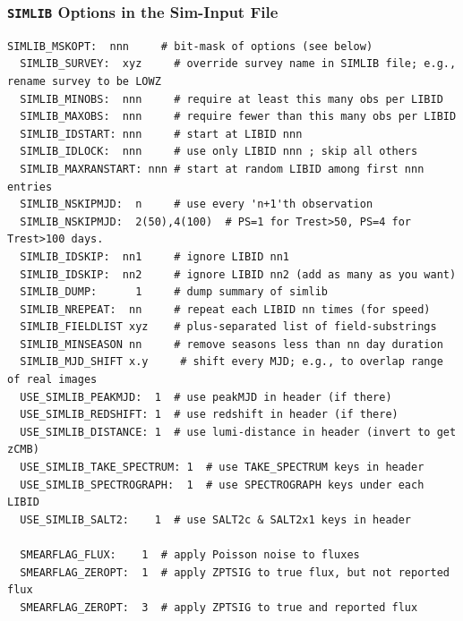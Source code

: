 \documentclass[12pt]{article}
\newcommand{\simlib}{{\tt SIMLIB}}
\begin{document}
{%
\clearpage
\subsubsection{{\simlib} Options in the Sim-Input File}
\label{sssec:simlib_options}

\begin{Verbatim}[frame=single]
  SIMLIB_MSKOPT:  nnn     # bit-mask of options (see below)
  SIMLIB_SURVEY:  xyz     # override survey name in SIMLIB file; e.g., rename survey to be LOWZ
  SIMLIB_MINOBS:  nnn     # require at least this many obs per LIBID
  SIMLIB_MAXOBS:  nnn     # require fewer than this many obs per LIBID
  SIMLIB_IDSTART: nnn     # start at LIBID nnn
  SIMLIB_IDLOCK:  nnn     # use only LIBID nnn ; skip all others
  SIMLIB_MAXRANSTART: nnn # start at random LIBID among first nnn entries
  SIMLIB_NSKIPMJD:  n     # use every 'n+1'th observation
  SIMLIB_NSKIPMJD:  2(50),4(100)  # PS=1 for Trest>50, PS=4 for Trest>100 days.
  SIMLIB_IDSKIP:  nn1     # ignore LIBID nn1
  SIMLIB_IDSKIP:  nn2     # ignore LIBID nn2 (add as many as you want)  
  SIMLIB_DUMP:      1     # dump summary of simlib 
  SIMLIB_NREPEAT:  nn     # repeat each LIBID nn times (for speed)
  SIMLIB_FIELDLIST xyz    # plus-separated list of field-substrings
  SIMLIB_MINSEASON nn     # remove seasons less than nn day duration
  SIMLIB_MJD_SHIFT x.y     # shift every MJD; e.g., to overlap range of real images
  USE_SIMLIB_PEAKMJD:  1  # use peakMJD in header (if there)
  USE_SIMLIB_REDSHIFT: 1  # use redshift in header (if there)
  USE_SIMLIB_DISTANCE: 1  # use lumi-distance in header (invert to get zCMB)
  USE_SIMLIB_TAKE_SPECTRUM: 1  # use TAKE_SPECTRUM keys in header 
  USE_SIMLIB_SPECTROGRAPH:  1  # use SPECTROGRAPH keys under each LIBID
  USE_SIMLIB_SALT2:    1  # use SALT2c & SALT2x1 keys in header

  SMEARFLAG_FLUX:    1  # apply Poisson noise to fluxes
  SMEARFLAG_ZEROPT:  1  # apply ZPTSIG to true flux, but not reported flux
  SMEARFLAG_ZEROPT:  3  # apply ZPTSIG to true and reported flux
\end{Verbatim}

}
\end{document}
